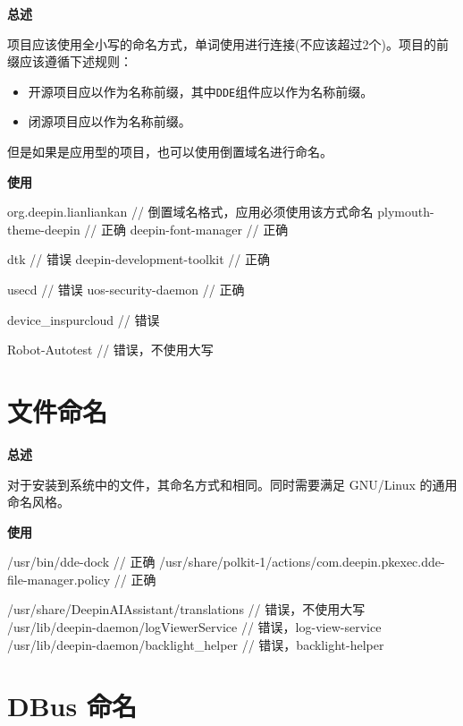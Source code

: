 \textbf{总述}

\deepin 项目应该使用全小写的命名方式，单词使用\cppinline{-}进行连接(\cppinline{-}不应该超过2个)。项目的前缀应该遵循下述规则：

\begin{itemize}
  \item 开源项目应以作为名称前缀，其中\texttt{DDE}组件应以作为名称前缀。
  \item 闭源项目应以作为名称前缀。
\end{itemize}

但是如果是应用型的项目，也可以使用倒置域名进行命名。

\textbf{使用}

\begin{cppcode}
  org.deepin.lianliankan     // 倒置域名格式，应用必须使用该方式命名
  plymouth-theme-deepin      // 正确
  deepin-font-manager        // 正确

  dtk                        // 错误
  deepin-development-toolkit // 正确

  usecd                      // 错误
  uos-security-daemon        // 正确

  device_inspurcloud         // 错误

  Robot-Autotest             // 错误，不使用大写
\end{cppcode}

\section{文件命名} \label{deepin-file-naming}

\textbf{总述}

对于安装到系统中的文件，其命名方式和相同。同时需要满足 GNU/Linux 的通用命名风格。

\textbf{使用}

\begin{cppcode}
  /usr/bin/dde-dock  // 正确
  /usr/share/polkit-1/actions/com.deepin.pkexec.dde-file-manager.policy  // 正确

  /usr/share/DeepinAIAssistant/translations  // 错误，不使用大写
  /usr/lib/deepin-daemon/logViewerService    // 错误，log-view-service
  /usr/lib/deepin-daemon/backlight_helper    // 错误，backlight-helper
\end{cppcode}

\section{DBus 命名}

